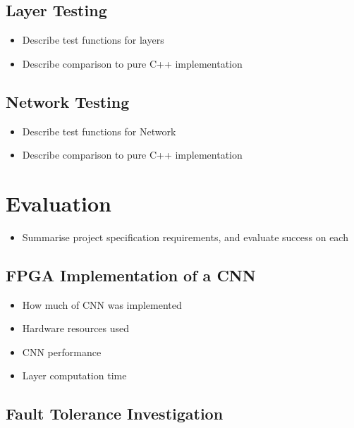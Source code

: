 \documentclass[12pt]{article}
\begin{document}
\subsection{Layer Testing}
\label{sec:Test-Layers}


\begin{itemize}
\item Describe test functions for layers
\item Describe comparison to pure C++ implementation
\end{itemize}

\subsection{Network Testing}
\label{sec:Test-Network}


\begin{itemize}
\item Describe test functions for Network
\item Describe comparison to pure C++ implementation
\end{itemize}

\newpage

\section{Evaluation}
\label{sec:Eval}


\begin{itemize}
\item Summarise project specification requirements, and evaluate success on each
\end{itemize}

\subsection{FPGA Implementation of a CNN}
\label{sec:Eval-FPGAImplOfCnn}


\begin{itemize}
\item How much of CNN was implemented
\item Hardware resources used
\item CNN performance
\item Layer computation time
\end{itemize}

\subsection{Fault Tolerance Investigation}
\label{sec:Eval-FaultTolInv}
\end{document}
